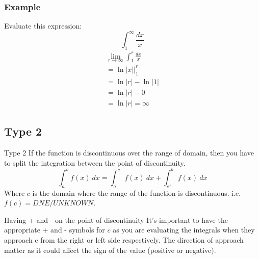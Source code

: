 \documentclass[letterpaper,10pt,twoside,twocolumn,openany]{book}
\begin{document}
\subsubsection{Example}
Evaluate this expression:
$$ \int_1^\infty \frac{dx}{x}$$
\begin{gather*}
    \lim_{r\to \infty} \int_1^r \frac{dx}{x}\\ 
    = \ln|x|\biggl|_1^r\\ 
    = \ln|r| - \ln|1|\\ 
    = \ln|r| - 0\\ 
    = \ln|r| = \infty
\end{gather*}


\subsection{Type 2}
\begin{paperbox}{Type 2}
    If the function is discontinuous over the range of domain, then you have to split the integration between the point of discontinuity.
    \begin{equation}
        \int_{a}^b f(x)\ dx = \int_{a}^{c^-} f(x)\ dx + \int_{c^+}^b f(x)\ dx 
    \end{equation}
    Where $c$ is the domain where the range of the function is discontinuous. i.e. $f(c) = DNE/UNKNOWN$.
\end{paperbox}
\begin{commentbox}{Having + and - on the point of discontinuity}
    It's important to have the appropriate + and - symbols for $c$ as you are evaluating the integrals when they approach c from the right or left side respectively. The direction of approach matter as it could affect the sign of the value (positive or negative).
\end{commentbox}
\end{document}
